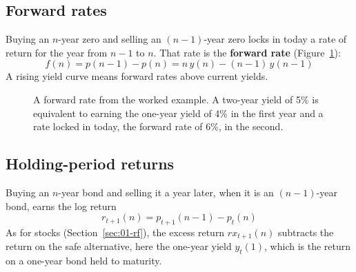\subsection{Forward rates}

Buying an $n$-year zero and selling an $(n-1)$-year zero locks in today a rate of return for the year from $n-1$ to $n$. That rate is the \textbf{forward rate} (Figure~\ref{fig:10-forward}):
\begin{equation}
  f(n) = p(n-1) - p(n) = n\,y(n) - (n-1)\,y(n-1)
  \label{eq:10-forward}
\end{equation}
A rising yield curve means forward rates above current yields.

\begin{figure}[htbp]
\centering
{}
\caption{A forward rate from the worked example. A two-year yield of 5\% is equivalent to earning the one-year yield of 4\% in the first year and a rate locked in today, the forward rate of 6\%, in the second.}
\label{fig:10-forward}
\end{figure}

\subsection{Holding-period returns}

Buying an $n$-year bond and selling it a year later, when it is an $(n-1)$-year bond, earns the log return
\begin{equation}
  r_{t+1}(n) = p_{t+1}(n-1) - p_t(n)
  \label{eq:10-hpr}
\end{equation}
As for stocks (Section~\ref{sec:01-rf}), the excess return $rx_{t+1}(n)$ subtracts the return on the safe alternative, here the one-year yield $y_t(1)$, which is the return on a one-year bond held to maturity.

